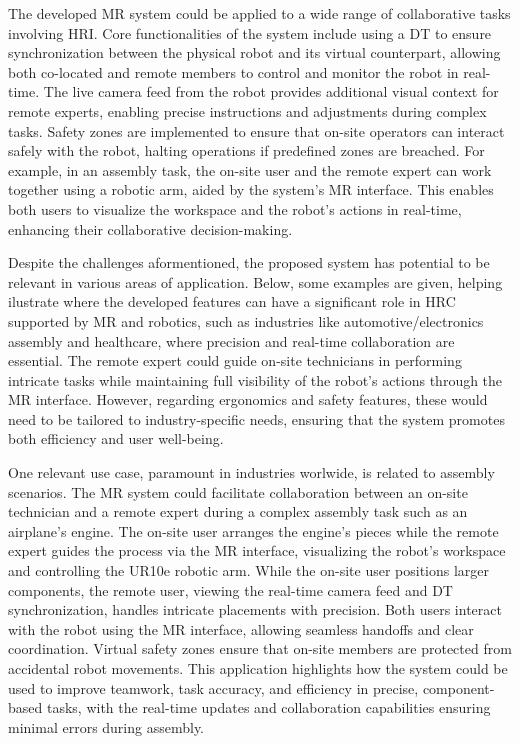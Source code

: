 The developed \ac{MR} system could be applied to a wide range of collaborative tasks involving \ac{HRI}. Core functionalities of the system include using a \ac{DT} to ensure synchronization between the physical robot and its virtual counterpart, allowing both co-located and remote members to control and monitor the robot in real-time. The live camera feed from the robot provides additional visual context for remote experts, enabling precise instructions and adjustments during complex tasks. Safety zones are implemented to ensure that on-site operators can interact safely with the robot, halting operations if predefined zones are breached. For example, in an assembly task, the on-site user and the remote expert can work together using a robotic arm, aided by the system’s \ac{MR} interface. This enables both users to visualize the workspace and the robot’s actions in real-time, enhancing their collaborative decision-making. 

Despite the challenges aformentioned, the proposed system has potential to be relevant in various areas of application. Below, some examples are given, helping ilustrate where the developed features can have a significant role in \ac{HRC} supported by \ac{MR} and robotics, such as industries like automotive/electronics assembly and healthcare, where precision and real-time collaboration are essential. The remote expert could guide on-site technicians in performing intricate tasks while maintaining full visibility of the robot’s actions through the \ac{MR} interface. However, regarding ergonomics and safety features, these would need to be tailored to industry-specific needs, ensuring that the system promotes both efficiency and user well-being.

One relevant use case, paramount in industries worlwide, is related to assembly scenarios. The \ac{MR} system could facilitate collaboration between an on-site technician and a remote expert during a complex assembly task such as an airplane's engine. The on-site user arranges the engine's pieces while the remote expert guides the process via the \ac{MR} interface, visualizing the robot’s workspace and controlling the UR10e robotic arm. While the on-site user positions larger components, the remote user, viewing the real-time camera feed and \ac{DT} synchronization, handles intricate placements with precision. Both users interact with the robot using the \ac{MR} interface, allowing seamless handoffs and clear coordination. Virtual safety zones ensure that on-site members are protected from accidental robot movements. This application highlights how the system could be used to improve teamwork, task accuracy, and efficiency in precise, component-based tasks, with the real-time updates and collaboration capabilities ensuring minimal errors during assembly.

